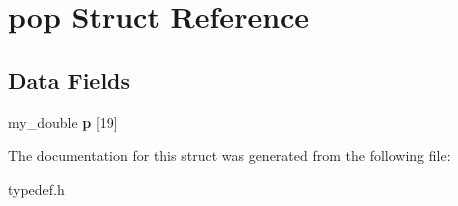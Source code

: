 \hypertarget{structpop}{\section{pop Struct Reference}
\label{structpop}
}
\subsection*{Data Fields}
\begin{DoxyCompactItemize}
\item 
\hypertarget{structpop_a6cfa44ec9502e562293f50b3b0f221a5}{my\-\_\-double {\bfseries p} \mbox{[}19\mbox{]}}\label{structpop_a6cfa44ec9502e562293f50b3b0f221a5}

\end{DoxyCompactItemize}


The documentation for this struct was generated from the following file\-:\begin{DoxyCompactItemize}
\item 
typedef.\-h\end{DoxyCompactItemize}
